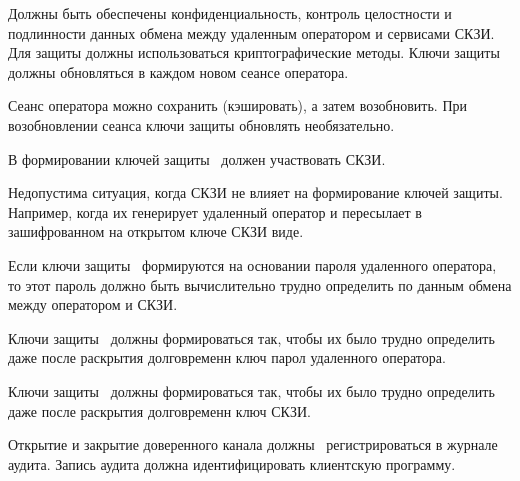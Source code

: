 \label{R.TC.Crypto}
Должны быть обеспечены конфиденциальность, контроль целостности и подлинности 
данных обмена между удаленным оператором и сервисами СКЗИ.
%
Для защиты должны использоваться криптографические методы.
%
Ключи защиты должны обновляться в каждом новом сеансе оператора.

\begin{note}
Сеанс оператора можно сохранить (кэшировать), а затем возобновить.
При возобновлении сеанса ключи защиты обновлять необязательно.
\end{note}

\label{R.TC.Keys}
В формировании ключей защиты~ должен участвовать СКЗИ.

\begin{note}
Недопустима ситуация, когда СКЗИ не влияет на формирование ключей защиты.
Например, когда их генерирует удаленный оператор и пересылает 
в зашифрованном на открытом ключе СКЗИ виде.
\end{note}

\label{R.TC.Pwd}
Если ключи защиты~ формируются на основании пароля
удаленного оператора, то этот пароль должно быть вычислительно
трудно определить по данным обмена между оператором и СКЗИ.

\label{R.TC.FSWeak}
Ключи защиты~ должны формироваться так, чтобы их было 
 трудно определить даже после раскрытия 
долговременн ключ  
парол удаленного оператора.

\label{R.TC.FS}
Ключи защиты~ должны формироваться так, 
чтобы их было  трудно определить даже после 
раскрытия долговременн ключ СКЗИ.

\label{R.TC.AU}
Открытие и закрытие доверенного канала должны~ 
регистрироваться в журнале аудита. Запись аудита должна идентифицировать 
клиентскую программу.



